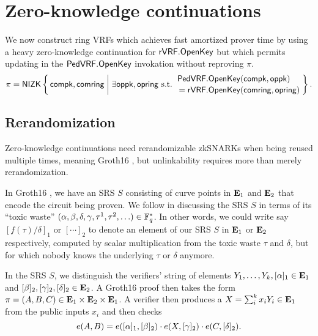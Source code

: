 
\section{Zero-knowledge continuations}
\label{sec:rvrf_cont}

\newcommand\rrSNARK{\primalgo{Groth16}\xspace}
\newcommand\pifast{\ensuremath{\pi_{\mathtt{fast}}}}
\newcommand\pisafe{\ensuremath{\pi_{\mathtt{safe}}}}

We now construct ring VRFs which achieves fast amortized prover time
by using a heavy zero-knowledge continuation for ${\mathsf{rVRF}}.{\mathsf{OpenKey}}$ but
which permits updating \openpk in the ${\mathsf{PedVRF}}.{\mathsf{OpenKey}}$ invokation
without reproving $\pi$.
$$ \pi = \NIZK \Setst{ \compk, \comring }{
 \exists \openpk,\openring \textrm{\ s.t.\ } 
 \genfrac{}{}{0pt}{}{\PedVRF.\OpenKey(\compk,\openpk) \quad}{\,\, = \rVRF.\OpenKey(\comring,\openring)}
} \mathperiod $$

\subsection{Rerandomization}

Zero-knowledge continuations need rerandomizable zkSNARKs
when being reused multiple times, meaning Groth16 \cite{groth16},
but unlinkability requires more than merely rerandomization.

In Groth16 \cite{groth16}, we have an SRS $S$ consisting of curve
points in ${\mathbf{E}}_1$ and ${\mathbf{E}}_2$ that encode the circuit being proven.
We follow \cite{groth16} in discussing the SRS $S$ in terms of
its ``toxic waste''
 $(\alpha,\beta,\delta,\gamma,\tau^1,\tau^2,\ldots) \in \mathbb{F}_q^*$.
In other words, we could write say $[ f(\tau)/\delta ]_1$ or $[\cdots]_2$
to denote an element of our SRS $S$ in ${\mathbf{E}}_1$ or ${\mathbf{E}}_2$ respectively,
computed by scalar multiplication from the toxic waste $\tau$ and $\delta$,
 but for which nobody knows the underlying $\tau$ or $\delta$ anymore.

In the SRS $S$, we distinguish the verifiers' string of elements
 $Y_1,\ldots,Y_k, [\alpha]_1 \in {\mathbf{E}}_1$ and
 $[\beta]_2, [\gamma]_2, [\delta]_2 \in {\mathbf{E}}_2$.
A Groth16 \cite{groth16} proof then takes the form 
 $\pi = (A,B,C) \in {\mathbf{E}}_1 \times {\mathbf{E}}_2 \times {\mathbf{E}}_1$.
A verifier then produces a $X = \sum_i^k x_i Y_i \in {\mathbf{E}}_1$ from
 the public inputs $x_i$ and then checks 
$$ e(A,B) = e([\alpha]_1, [\beta]_2) \cdot
 e(X, [\gamma]_2) \cdot e(C, [\delta]_2) . $$

